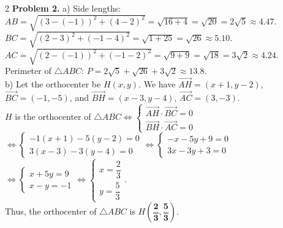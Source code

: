 \documentclass[10pt,a4paper]{article}
\begin{document}
\begin{multicols}{2}
\textbf{Problem 2.}
a) Side lengths:\\
$AB = \sqrt{(3 - (-1))^2 + (4 - 2)^2} = \sqrt{16 + 4} = \sqrt{20} = 2\sqrt{5} \approx 4.47$.\\
$BC = \sqrt{(2 - 3)^2 + (-1 - 4)^2} = \sqrt{1 + 25} = \sqrt{26} \approx 5.10$.\\
$AC = \sqrt{(2 - (-1))^2 + (-1 - 2)^2} = \sqrt{9 + 9} = \sqrt{18} = 3\sqrt{2} \approx 4.24$.\\
Perimeter of $\triangle ABC$: $P = 2\sqrt{5} + \sqrt{26} + 3\sqrt{2} \approx \mathbf{13.8}$.\\
b) Let the orthocenter be $H(x, y)$. We have $\vec{AH} = (x + 1, y - 2)$, $\vec{BC} = (-1, -5)$, and $\vec{BH} = (x - 3, y - 4)$, $\vec{AC} = (3, -3)$.\\
$H$ is the orthocenter of $\triangle ABC \Leftrightarrow \begin{cases} \vec{AH} \cdot \vec{BC} = 0 \\ \vec{BH} \cdot \vec{AC} = 0 \end{cases}$\\
$\Leftrightarrow \begin{cases} -1(x + 1) - 5(y - 2) = 0 \\ 3(x - 3) - 3(y - 4) = 0 \end{cases} \Leftrightarrow \begin{cases} -x - 5y + 9 = 0 \\ 3x - 3y + 3 = 0 \end{cases}$\\
$\Leftrightarrow \begin{cases} x + 5y = 9 \\ x - y = -1 \end{cases} \Leftrightarrow \begin{cases} x = \dfrac{2}{3} \\ y = \dfrac{5}{3} \end{cases}$.\\
Thus, the orthocenter of $\triangle ABC$ is $H\left(\mathbf{\dfrac{2}{3}}, \mathbf{\dfrac{5}{3}}\right)$.


\end{multicols}
\end{document}
